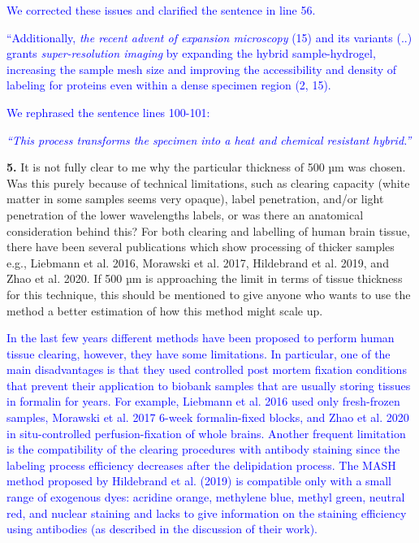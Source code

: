 \documentclass{article}
\newcommand{\reply}[1]{\textcolor{blue}{#1}}
\begin{document}
\noindent \reply{We corrected these issues and clarified the sentence in line 56.}

\noindent \reply{“Additionally,} \reply{\emph{the recent advent of expansion microscopy}} \reply{(15) and its variants (..) grants} \reply{\emph{super-}}\reply{\emph{resolution imaging}} \reply{by expanding the hybrid sample-hydrogel, increasing the sample mesh size and} \reply{improving the accessibility and density of labeling for proteins even within a dense specimen} \reply{region (2, 15).}

\noindent \reply{We rephrased the sentence lines 100-101:}

\noindent \reply{\emph{“This process transforms the specimen into a heat and chemical resistant hybrid.”}}

\noindent \textbf{5.} It is not fully clear to me why the particular thickness of 500 µm was chosen. Was this purely because of technical limitations, such as clearing capacity (white matter in some samples seems very opaque), label penetration, and/or light penetration of the lower wavelengths labels, or was there an anatomical consideration behind this? For both clearing and labelling of human brain tissue, there have been several publications which show processing of thicker samples e.g., Liebmann et al. 2016, Morawski et al. 2017, Hildebrand et al. 2019, and Zhao et al. 2020. If 500 µm is approaching the limit in terms of tissue thickness for this technique, this should be mentioned to give anyone who wants to use the method a better estimation of how this method might scale up.

\noindent \reply{In the last few years different methods have been proposed to perform human tissue clearing,} \reply{however, they have some limitations. In particular, one of the main disadvantages is that they used} \reply{controlled post mortem fixation conditions that prevent their application to biobank samples that are} \reply{usually storing tissues in formalin for years. For example, Liebmann et al. 2016 used only fresh-}\reply{frozen samples, Morawski et al. 2017 6-week formalin-fixed blocks, and Zhao et al. 2020 in situ-}\reply{controlled perfusion-fixation of whole brains. Another frequent limitation is the compatibility of the} \reply{clearing procedures with antibody staining since the labeling process efficiency decreases after the} \reply{delipidation process. The MASH method proposed by Hildebrand et al. (2019) is compatible only} \reply{with a small range of exogenous dyes: acridine orange, methylene blue, methyl green, neutral red,} \reply{and nuclear staining and lacks to give information on the staining efficiency using antibodies (as} \reply{described in the discussion of their work).}
\end{document}
